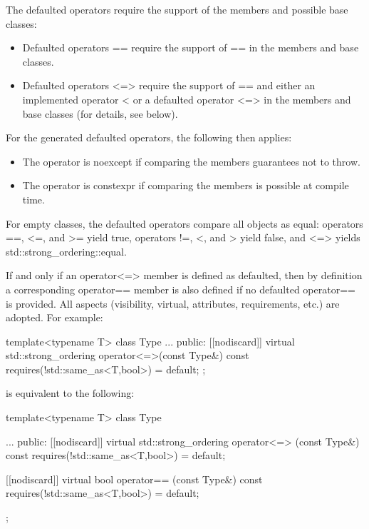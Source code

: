 The defaulted operators require the support of the members and possible base classes:

\begin{itemize}
\item
Defaulted operators == require the support of == in the members and base classes.

\item
Defaulted operators <=> require the support of == and either an implemented operator < or a defaulted operator <=> in the members and base classes (for details, see below).
\end{itemize}

For the generated defaulted operators, the following then applies:

\begin{itemize}
\item
The operator is noexcept if comparing the members guarantees not to throw.

\item
The operator is constexpr if comparing the members is possible at compile time.
\end{itemize}

For empty classes, the defaulted operators compare all objects as equal: operators ==, <=, and >= yield true, operators !=, <, and > yield false, and <=> yields std::strong\_ordering::equal.



If and only if an operator<=> member is defined as defaulted, then by definition a corresponding operator== member is also defined if no defaulted operator== is provided. All aspects (visibility, virtual, attributes, requirements, etc.) are adopted. For example:

\begin{cpp}
template<typename T>
class Type {
	...
	public:
		[[nodiscard]] virtual std::strong_ordering
			operator<=>(const Type&) const requires(!std::same_as<T,bool>) = default;
};
\end{cpp}

is equivalent to the following:

\begin{cpp}
template<typename T>
class Type {
	...
	public:
	[[nodiscard]] virtual std::strong_ordering
		operator<=> (const Type&) const requires(!std::same_as<T,bool>) = default;
	
	[[nodiscard]] virtual bool
		operator== (const Type&) const requires(!std::same_as<T,bool>) = default;
};
\end{cpp}

